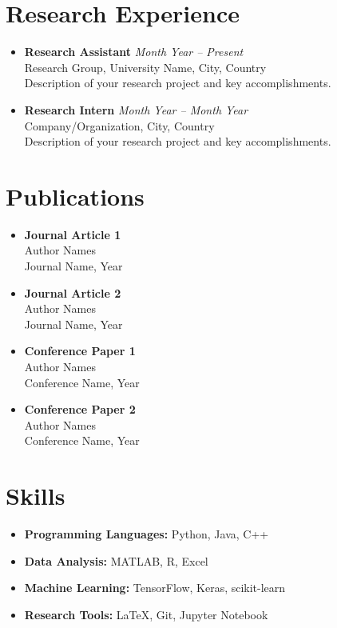 \documentclass[11pt,a4paper]{article}
\begin{document}
\section{Research Experience}
\begin{itemize}
    \item[] \textbf{Research Assistant} \hfill \textit{Month Year -- Present}\\
    Research Group, University Name, City, Country\\
    Description of your research project and key accomplishments.
    
    \item[] \textbf{Research Intern} \hfill \textit{Month Year -- Month Year}\\
    Company/Organization, City, Country\\
    Description of your research project and key accomplishments.
\end{itemize}

\section{Publications}
\begin{multicols}{2}
\begin{itemize}
    \item[] \textbf{Journal Article 1}\\
    Author Names\\
    Journal Name, Year
    
    \item[] \textbf{Journal Article 2}\\
    Author Names\\
    Journal Name, Year
    
    \item[] \textbf{Conference Paper 1}\\
    Author Names\\
    Conference Name, Year
    
    \item[] \textbf{Conference Paper 2}\\
    Author Names\\
    Conference Name, Year
\end{itemize}
\end{multicols}

\section{Skills}
\begin{itemize}
    \item[] \textbf{Programming Languages:} Python, Java, C++
    \item[] \textbf{Data Analysis:} MATLAB, R, Excel
    \item[] \textbf{Machine Learning:} TensorFlow, Keras, scikit-learn
    \item[] \textbf{Research Tools:} LaTeX, Git, Jupyter Notebook
\end{itemize}
\end{document}
